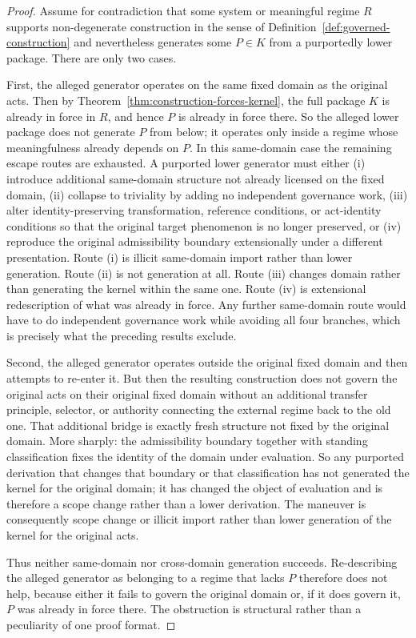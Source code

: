 \documentclass[11pt]{article}
\theoremstyle{definition}
\theoremstyle{remark}
\begin{document}
\begin{proof}
Assume for contradiction that some system or meaningful regime $R$ supports non-degenerate construction in the sense of Definition~\ref{def:governed-construction} and nevertheless generates some $P \in K$ from a purportedly lower package. There are only two cases.

First, the alleged generator operates on the same fixed domain as the original acts. Then by Theorem~\ref{thm:construction-forces-kernel}, the full package $K$ is already in force in $R$, and hence $P$ is already in force there. So the alleged lower package does not generate $P$ from below; it operates only inside a regime whose meaningfulness already depends on $P$. In this same-domain case the remaining escape routes are exhausted. A purported lower generator must either (i) introduce additional same-domain structure not already licensed on the fixed domain, (ii) collapse to triviality by adding no independent governance work, (iii) alter identity-preserving transformation, reference conditions, or act-identity conditions so that the original target phenomenon is no longer preserved, or (iv) reproduce the original admissibility boundary extensionally under a different presentation. Route (i) is illicit same-domain import rather than lower generation. Route (ii) is not generation at all. Route (iii) changes domain rather than generating the kernel within the same one. Route (iv) is extensional redescription of what was already in force. Any further same-domain route would have to do independent governance work while avoiding all four branches, which is precisely what the preceding results exclude.

Second, the alleged generator operates outside the original fixed domain and then attempts to re-enter it. But then the resulting construction does not govern the original acts on their original fixed domain without an additional transfer principle, selector, or authority connecting the external regime back to the old one. That additional bridge is exactly fresh structure not fixed by the original domain. More sharply: the admissibility boundary together with standing classification fixes the identity of the domain under evaluation. So any purported derivation that changes that boundary or that classification has not generated the kernel for the original domain; it has changed the object of evaluation and is therefore a scope change rather than a lower derivation. The maneuver is consequently scope change or illicit import rather than lower generation of the kernel for the original acts.

Thus neither same-domain nor cross-domain generation succeeds. Re-describing the alleged generator as belonging to a regime that lacks $P$ therefore does not help, because either it fails to govern the original domain or, if it does govern it, $P$ was already in force there. The obstruction is structural rather than a peculiarity of one proof format.
\end{proof}
\end{document}
